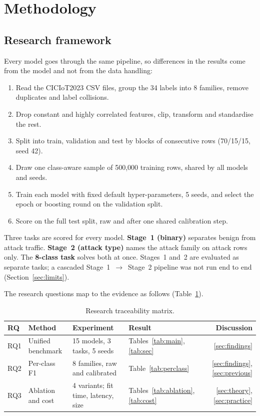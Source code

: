 \documentclass[11pt,a4paper]{article}
\begin{document}
\section{Methodology}

\subsection{Research framework}
Every model goes through the same pipeline, so differences in the results come from the model and not from the data handling:
\begin{enumerate}
  \item Read the CICIoT2023 CSV files, group the 34 labels into 8 families, remove duplicates and label collisions.
  \item Drop constant and highly correlated features, clip, transform and standardise the rest.
  \item Split into train, validation and test by blocks of consecutive rows (70/15/15, seed 42).
  \item Draw one class-aware sample of 500{,}000 training rows, shared by all models and seeds.
  \item Train each model with fixed default hyper-parameters, 5 seeds, and select the epoch or boosting round on the validation split.
  \item Score on the full test split, raw and after one shared calibration step.
\end{enumerate}
Three tasks are scored for every model. \textbf{Stage~1 (binary)} separates benign from attack traffic. \textbf{Stage~2 (attack type)} names the attack family on attack rows only. The \textbf{8-class task} solves both at once. Stages~1 and~2 are evaluated as separate tasks; a cascaded Stage~1~$\rightarrow$~Stage~2 pipeline was not run end to end (Section~\ref{sec:limits}).

The research questions map to the evidence as follows (Table~\ref{tab:trace}).

\begin{table}[h]
\centering\small
\caption{Research traceability matrix.}\label{tab:trace}
\begin{tabular}{@{}llllr@{}}
\toprule
RQ & Method & Experiment & Result & Discussion \\
\midrule
RQ1 & Unified benchmark & 15 models, 3 tasks, 5 seeds & Tables~\ref{tab:main}, \ref{tab:sec} & \ref{sec:findings} \\
RQ2 & Per-class F1 & 8 families, raw and calibrated & Table~\ref{tab:perclass} & \ref{sec:findings}, \ref{sec:previous} \\
RQ3 & Ablation and cost & 4 variants; fit time, latency, size & Tables~\ref{tab:ablation}, \ref{tab:cost} & \ref{sec:theory}, \ref{sec:practice} \\
\bottomrule
\end{tabular}
\end{table}
\end{document}
